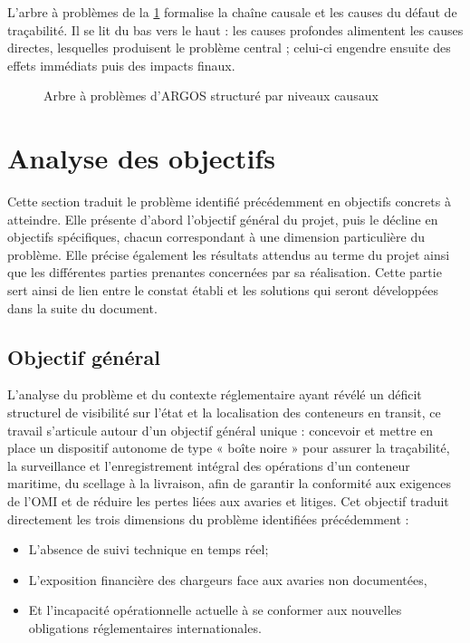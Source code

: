 L'arbre à problèmes de la \cref{fig-arbre-probleme} formalise la chaîne causale et les causes du défaut de traçabilité. Il se lit du bas vers le haut : les causes profondes alimentent les causes directes, lesquelles produisent le problème central ; celui-ci engendre ensuite des effets immédiats puis des impacts finaux.

\begin{figure}
    \centering
    
    \caption{Arbre à problèmes d'ARGOS structuré par niveaux causaux}
    \label{fig-arbre-probleme}
\end{figure}
\tablesourcepromoteurs

\section{Analyse des objectifs}

Cette section traduit le problème identifié précédemment en objectifs concrets à atteindre. Elle présente d'abord l'objectif général du projet, puis le décline en objectifs spécifiques, chacun correspondant à une dimension particulière du problème. Elle précise également les résultats attendus au terme du projet ainsi que les différentes parties prenantes concernées par sa réalisation. Cette partie sert ainsi de lien entre le constat établi et les solutions qui seront développées dans la suite du document.

\subsection{Objectif général}

L'analyse du problème et du contexte réglementaire ayant révélé un déficit structurel de visibilité sur l'état et la localisation des conteneurs en transit, ce travail s'articule autour d'un objectif général unique : concevoir et mettre en place un dispositif autonome de type « boîte noire » pour assurer la traçabilité, la surveillance et l'enregistrement intégral des opérations d'un conteneur maritime, du scellage à la livraison, afin de garantir la conformité aux exigences de l’OMI et de réduire les pertes liées aux avaries et litiges.
Cet objectif traduit directement les trois dimensions du problème identifiées précédemment :
\begin{itemize}
  \item L'absence de suivi technique en temps réel; 
  \item L'exposition financière des chargeurs face aux avaries non documentées, 
  \item Et l'incapacité opérationnelle actuelle à se conformer aux nouvelles obligations réglementaires internationales.
\end{itemize}

